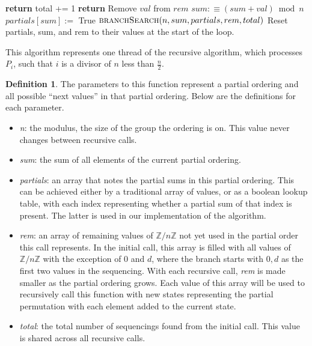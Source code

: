 \documentclass[12pt]{article}
\theoremstyle{plain}
\theoremstyle{definition}
\newtheorem{definition}{Definition}
\theoremstyle{remark}
\newcommand{\ZZ}{\mathbb{Z}}
\begin{document}
\begin{algorithm}[H]
\caption{Recursive Branch Search}\label{alg:branchrecurse}
\begin{algorithmic}[1]
\State \textbf{return}
\EndIf
{}
\State total += 1
\State \textbf{return}
\EndIf
{}
\State Remove $val$ from $rem$
\State $sum :\equiv (sum + val) \bmod{n}$
 
\State $partials[sum] :=$ True
\State $\textsc{branchSearch}(n, sum, partials, rem, total)$
\EndIf
\State Reset partials, sum, and rem to their values at the start of the loop.
\EndFor
\EndProcedure
\end{algorithmic}
\end{algorithm}

\par This algorithm represents one thread of the recursive algorithm, which processes $P_i$,  such that $i$ is a divisor of $n$ less than $\frac{n}{2}$. 

\begin{definition}\label{var_names}
The parameters to this function represent a partial ordering and all possible ``next values'' in that partial ordering. Below are the definitions for each parameter.
\begin{itemize}
    \item \textit{n}: the modulus, the size of the group the ordering is on. This value never changes between recursive calls. 
    \item \textit{sum}: the sum of all elements of the current partial ordering.
    \item \textit{partials}: an array that notes the partial sums in  this partial ordering. This can be achieved either by a traditional array of values, or as a boolean lookup table, with each index representing whether a partial sum of that index is present. The latter is used in our implementation of the algorithm.
    \item \textit{rem}: an array of remaining values of $\ZZ/n\ZZ$ not yet used in the partial order this call represents. In the initial call, this array is filled with all values of $\ZZ/n\ZZ$ with the exception of $0$ and $d$, where the branch starts with $0,d$ as the first two values in the sequencing. With each recursive call, \textit{rem} is made smaller as the partial ordering grows.
    Each value of this array will be used to recursively call this function with new states representing the partial permutation with each element added to the current state.

    \item \textit{total}: the total number of sequencings found from the initial call. This value is shared across all recursive calls.

\end{itemize}
\end{definition}
\end{document}
